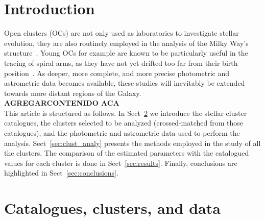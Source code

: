 \documentclass{aa}
\begin{document}

\maketitle


\section{Introduction}

 Open clusters (OCs) are not only used as laboratories to investigate stellar
 evolution, they are also routinely employed in the analysis of the Milky Way's
 structure~\citep{Loktin_1992,Moitinho_2006,Vazquez2008,Moitinho_2010}.
 Young OCs for example are known to be particularly
 useful in the tracing of spiral arms, as they have not yet drifted too far
 from their birth position~\citep{carraro_2013,Molina_2018}. As deeper, more
 complete, and more precise photometric and astrometric data becomes available,
 these studies will inevitably be extended towards more distant regions of the
 Galaxy.\\

 \textbf{AGREGARCONTENIDO ACA}\\

 This article is structured as follows. In Sect~\ref{sec:cat_clust_data} we
 introduce the stellar cluster catalogues, the clusters selected to be
 analyzed (crossed-matched from those catalogues), and the photometric and 
 astrometric data used to perform the analysis. Sect~\ref{sec:clust_analy}
 presents the methods employed in the study of all the clusters. The comparison
 of the estimated parameters with the catalogued values for each cluster is done
 in Sect~\ref{sec:results}. Finally, conclusions are highlighted in
 Sect~\ref{sec:conclusions}.





\section{Catalogues, clusters, and data}
 \label{sec:cat_clust_data}
\end{document}
